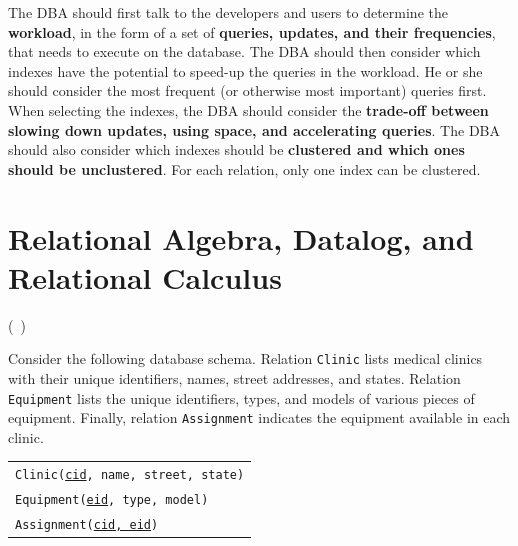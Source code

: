 \documentclass[addpoints,answers,12pt]{exam}
\begin{document}
\begin{questions}
\begin{parts}
\begin{solution}
  The DBA should first talk to the developers and users to determine
  the \textbf{workload}, in the form of a set of \textbf{queries,
    updates, and their frequencies}, that needs to execute on the
  database. The DBA should then consider which indexes have the
  potential to speed-up the queries in the workload. He or she should
  consider the most frequent (or otherwise most important) queries
  first. When selecting the indexes, the DBA should consider the
  \textbf{trade-off between slowing down updates, using space, and
    accelerating queries}. The DBA should also consider which indexes
  should be \textbf{clustered and which ones should be unclustered}.
  For each relation, only one index can be clustered.
\end{solution}


\end{parts}
\newpage

\section{Relational Algebra, Datalog, and Relational Calculus}

\question (\totalpoints\ \points) 

Consider the following database schema. Relation \texttt{Clinic} lists
medical clinics with their unique identifiers, names, street
addresses, and states. Relation \texttt{Equipment} lists the unique
identifiers, types, and models of various pieces of
equipment. Finally, relation \texttt{Assignment} indicates the
equipment available in each clinic.

\begin{tabular}{l}
  \texttt{Clinic(\underline{cid}, name, street, state)} \\
  \texttt{Equipment(\underline{eid}, type, model)} \\
  \texttt{Assignment(\underline{cid, eid})} \\
\end{tabular}

\newpage
{}
\end{questions}
\end{document}
